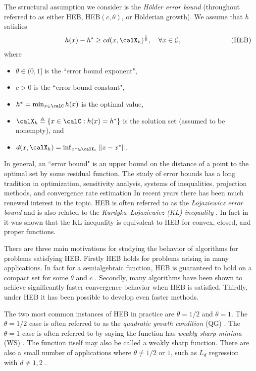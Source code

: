 \documentclass[smallextended]{svjour3}
\begin{document}
The structural assumption we consider is the \emph{H\"older error bound} (throughout referred to as either HEB, HEB$(c,\theta)$, or H\"olderian growth). We assume that $h$ satisfies
\begin{eqnarray*}\label{errorBound}
\hspace{3cm}h(x)-h^*\geq c d(x,\calX_h)^{\frac{1}{\theta}},\quad\forall x\in\mathcal{C},\hspace{2.5cm}(\text{HEB})
\end{eqnarray*}
where
\begin{itemize}
	\item $\theta\in(0,1]$ is the ``error bound exponent",
	\item $c>0$ is the ``error bound constant",
	\item $h^*=\min_{x\in\calC}h(x)$ is the optimal value,
\item 
$\calX_h\triangleq\{x\in\calC:h(x)=h^*\}$ is the solution set (assumed to be nonempty), and
\item 
 $d(x,\calX_h)=\inf_{x^*\in\calX_h}\|x-x^*\|$. 
\end{itemize}
In general, an ``error bound" is an upper bound on the distance of a point to the optimal set by some residual function. The study of error bounds has a long tradition in optimization, sensitivity analysis, systems of inequalities, projection methods, and convergence rate estimation \cite{li2013global,tseng2010approximation,zhou2015unified,xu2016accelerate,bolte2015error,burke1993weak,zhang2013gradient,pang1997error,luo1993error,ferris1991finite,burke2002weak,karimi2016linear,beck2015linearly} In recent years there has been much renewed interest in the topic.  HEB is often referred to as the \emph{{\L}ojaziewicz error bound} \cite{bolte2007lojasiewicz} and is also related to the \emph{Kurdyka--\L ojaziewicz (KL) inequality} \cite{bolte2015error}. In fact in \cite{bolte2015error} it was shown that the KL inequality is equivalent to HEB for convex, closed, and proper functions.


There are three main motivations for studying the behavior of algorithms for problems satisfying  HEB. Firstly HEB holds for problems arising in many applications. In fact for a semialgebraic function, HEB is guaranteed to hold on a compact set for some $\theta$ and $c$ \cite{bolte2015error}. Secondly, many algorithms have been shown to achieve significantly faster convergence behavior when HEB is satisfied. Thirdly, under HEB it has been possible to develop even faster methods. 

The two most common instances of HEB in practice are $\theta=1/2$ and $\theta=1$. The $\theta=1/2$ case is often referred to as the \emph{quadratic growth condition} (QG) \cite{karimi2016linear}. The $\theta=1$ case is often referred to by saying the function has \emph{weakly sharp minima} (WS) \cite{burke2002weak}. The function itself may also be called a weakly sharp function. There are also a small number of applications where $\theta\neq 1/2$ or $1$, such as $L_d$ regression with $d\neq 1,2$ \cite{agrb1992maximum}. 
 
\end{document}
